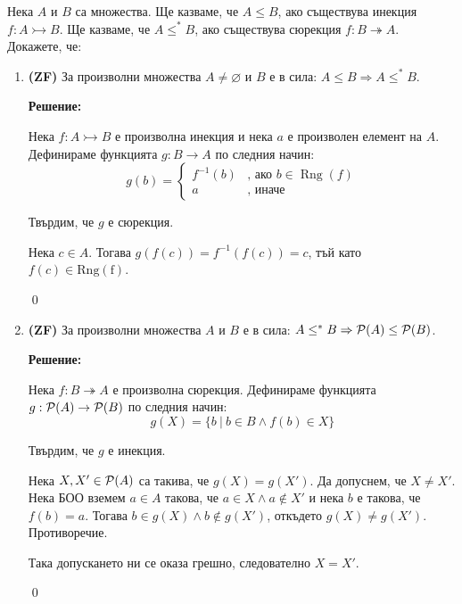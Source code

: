 \begin{problem}
Нека $A$ и $B$ са множества.
Ще казваме, че $A \leq B$, ако съществува инекция
$f : A \rightarrowtail B$.
Ще казваме, че $A \leq^* B$, ако съществува сюрекция
$f : B \twoheadrightarrow A$.
Докажете, че:
\begin{enumerate}
\item
\textbf{(ZF)}
За произволни множества $A \neq \varnothing$ и $B$ е в сила:
$A \leq B \Rightarrow A \leq^* B$.

\textbf{Решение:}

\smallbreak
\quad
Нека $f: A \rightarrowtail B$ е произволна инекция и нека $a$ е произволен елемент на $A$.
Дефинираме функцията $g: B \rightarrow A$ по следния начин:
\[
g(b) = \begin{cases}
       f^{-1}(b) & \text{, ако $b \in \operatorname{Rng}(f)$} \\
	   a       & \text{, иначе}
       \end{cases}
\]

\quad
Твърдим, че $g$ е сюрекция.

\begin{tcolorbox}[mybox={Доказателство:}]
\quad
Нека $c \in A$. Тогава $g(f(c)) = f^{-1}(f(c)) = c$, тъй като $f(c) \in \operatorname{Rng(f)}$.

\qed
\end{tcolorbox}

\item
\textbf{(ZF)}
За произволни множества $A$ и $B$ е в сила:
$A \leq^* B \Rightarrow \mathcal{P}(A) \leq \mathcal{P}(B)$.

\textbf{Решение:}

\smallbreak
\quad
Нека $f: B \twoheadrightarrow A$ е произволна сюрекция.
Дефинираме функцията $g: \mathcal{P}(A) \rightarrow \mathcal{P}(B)$ по следния начин:
\[
g(X) = \{b\ |\ b \in B \land f(b) \in X \}
\]

\quad
Твърдим, че $g$ е инекция.

\begin{tcolorbox}[mybox={Доказателство:}]
\quad
Нека $X, X' \in \mathcal{P}(A)$ са такива, че $g(X) = g(X')$.
Да допуснем, че $X \neq X'$. Нека БОО вземем $a \in A$ такова, че $a \in X \land a \notin X'$
и нека $b$ е такова, че $f(b) = a$. Тогава $b \in g(X) \land b \notin g(X')$,
откъдето $g(X) \neq g(X')$. Противоречие.

\quad
Така допускането ни се оказа грешно, следователно $X = X'$.

\qed
\end{tcolorbox}


\end{enumerate}
\end{problem}
